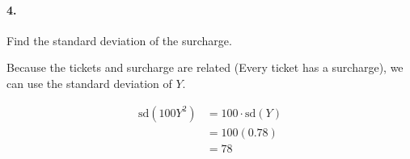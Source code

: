     \paragraph*{4.}
    Find the standard deviation of the surcharge.

    \begin{mdframed}
        Because the tickets and surcharge are related (Every ticket has a surcharge), we can use the standard deviation of $Y$.

        \begin{align*}
            \text{sd}(100Y^2)   & = 100 \cdot \text{sd}(Y)  \\
                                & = 100(0.78)               \\
                                & = \boxed{78}
        \end{align*}
    \end{mdframed}

